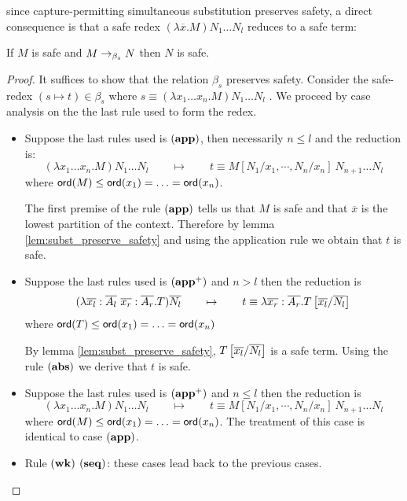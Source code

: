 since capture-permitting simultaneous substitution preserves safety, a direct consequence is that
a safe redex $(\lambda \overline{x} . M) N_1 \ldots N_l$ reduces to a safe term:

\begin{lem} If $M$ is safe and $M \rightarrow_{\beta_s} N$ then $N$ is safe.
\end{lem}

\begin{proof}
It suffices to show that the relation $\beta_s$ preserves safety.
Consider the safe-redex $(s\mapsto t) \in \beta_s$ where $ s \equiv (\lambda x_1 \ldots x_n . M) N_1 \ldots N_l $ .
We proceed by case analysis on the the last rule used to form the redex.
\begin{itemize}
\item Suppose the last rules used is $\mathbf{(app)}$, then necessarily $n\leq l$ and the reduction is:
$$(\lambda x_1 \ldots x_n . M) N_1 \ldots N_l \qquad \mapsto  \qquad t \equiv M[N_1 / x_1 , \cdots, N_n / x_n]\ N_{n+1} \ldots N_l$$
where ${\sf ord}(M) \leq {\sf ord}(x_1) = \ldots = {\sf ord}(x_n)$.

The first premise of the rule $\mathbf{(app)}$ tells us that $M$ is safe and that $\overline{x}$ is the lowest partition of the context.
Therefore by lemma \ref{lem:subst_preserve_safety} and using the application rule we obtain that $t$ is safe.

\item Suppose the last rules used is $\mathbf{(app^+)}$ and $n> l$ then the reduction is
$$ (\lambda \overline{x_l} : \overline{A_l} \
\overline{x_r}: \overline{A_r} . T) \overline{N_l} \qquad \mapsto
\qquad t \equiv \lambda \overline{x_r}: \overline{A_r} .
T\left[ \overline{x_l}/\overline{N_l} \right]
$$
where ${\sf ord}(T) \leq {\sf ord}(x_1) = \ldots = {\sf ord}(x_n)$

By lemma \ref{lem:subst_preserve_safety}, $T\left[ \overline{x_l}/\overline{N_l} \right]$ is a safe term.
Using the rule $\mathbf{(abs)}$ we derive that $t$ is safe.

\item Suppose the last rules used is $\mathbf{(app^+)}$ and $n\leq l$ then the reduction is
$$(\lambda x_1 \ldots x_n . M) N_1 \ldots N_l \qquad \mapsto \qquad t \equiv M[N_1 / x_1 , \cdots, N_n / x_n]\ N_{n+1} \ldots N_l$$
where ${\sf ord}(M) \leq {\sf ord}(x_1) = \ldots = {\sf ord}(x_n)$. The treatment of this case is identical to case $\mathbf{(app)}$.

\item Rule $\mathbf{(wk)}$ $\mathbf{(seq)}$: these cases lead back to the previous cases.
\end{itemize}
\end{proof}


